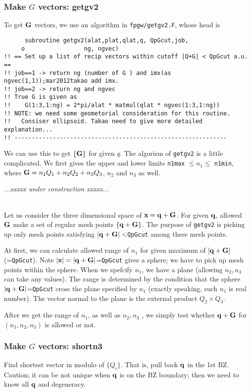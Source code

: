 \documentclass[a4paper,10pt,epsf,fleqn]{article}
\def\underconstruction{{\it...xxxxx under construction xxxxx...\\}}
\newcommand{\bfq}{{\bf q}}
\newcommand{\bfG}{{\bf G}}
\begin{document}
\subsubsection{Make $G$ vectors: getgv2}
To get $\bfG$ vectors, we use an algorithm in \verb!fpgw/getgv2.F!, whose head
is
\begin{verbatim}
      subroutine getgv2(alat,plat,qlat,q, QpGcut,job,
     o                 ng, ngvec)
!! == Set up a list of recip vectors within cutoff |Q+G| < QpGcut a.u. ==
!! job==1 -> return ng (number of G ) and imx(as ngvec(1,1));mar2012takao add imx.
!! job==2 -> return ng and ngvec
!! True G is given as
!!    G(1:3,1:ng) = 2*pi/alat * matmul(qlat * ngvec(1:3,1:ng))
!! NOTE: we need some geometorial consideration for this routine.
!!   Consiser ellipsoid. Takao need to give more detailed explanation...
!! -------------------------------------------------------------
\end{verbatim}
We can use this to get $\{\bfG\}$ for given $q$.
The algorism of \verb!getgv2! is a little complicated.
We first gives the upper and lower limits {\tt n1max} $\le n_1 \le $ {\tt n1min}, 
where $\bfG= n_1 Q_1 + n_2 Q_2 + n_3 Q_3$, $n_2$ and $n_3$ as well.

\underconstruction

\\
Let us consider the three dimensional space of ${\bf x}= \bfq+\bfG$.
For given $\bfq$, allowed $\bfG$ make a set of regular mesh points $\{\bfq+\bfG\}$.
The purpose of {\tt getgv2} is picking up only mesh points satisfying
$|\bfq+\bfG|<${\tt QpGcut} among these mesh points.

At first, we can calculate allowed range of $n_1$ for given maximum of 
$|\bfq+\bfG|$ (={\tt QpGcut}). Note $|{\bf x}|=|\bfq+\bfG|$={\tt QpGcut}
gives a sphere; we have to pick up mesh points within the sphere.
When we spefcify $n_1$, we have a plane 
(allowing $n_2,n_3$ can take any values).
The range is determined by the condition that the sphere 
$|\bfq+\bfG|$={\tt QpGcut} cross the plane specified by $n_1$ 
(exactly speaking, such $n_1$ is real number).
The vector normal to the plane is the external product $Q_2 \times Q_3$.

After we get the range of $n_1$, as well as $n_2,n_3$ ,
we simply test whether $\bfq+\bfG$ for $(n_1,n_2,n_3)$ is allowed or not.


\subsubsection{Make $G$ vectors: shortn3}
Find shortest vector in modulo of $\{Q_i\}$. That is, pull back $\bfq$ in the 1st BZ.
Caution; it can be not unique when $\bfq$ is on the BZ boundary;
then we need to know all $\bfq$ and degeneracy.
\end{document}
